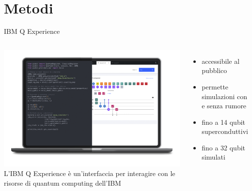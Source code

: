 \documentclass{beamer}
\begin{document}
    \section{Metodi}

    \begin{frame}{IBM Q Experience}
        \begin{columns}
            \includegraphics[width=\textwidth]{gfx/laptop_strumenti.png}
            L'IBM Q Experience è un'interfaccia per interagire con le risorse di quantum computing dell'IBM
            \begin{itemize}
                \item accessibile al pubblico
                \item permette simulazioni con e senza rumore
                \item fino a 14 qubit superconduttivi
                \item fino a 32 qubit simulati
            \end{itemize}
        \end{columns}
    \end{frame}
\end{document}
